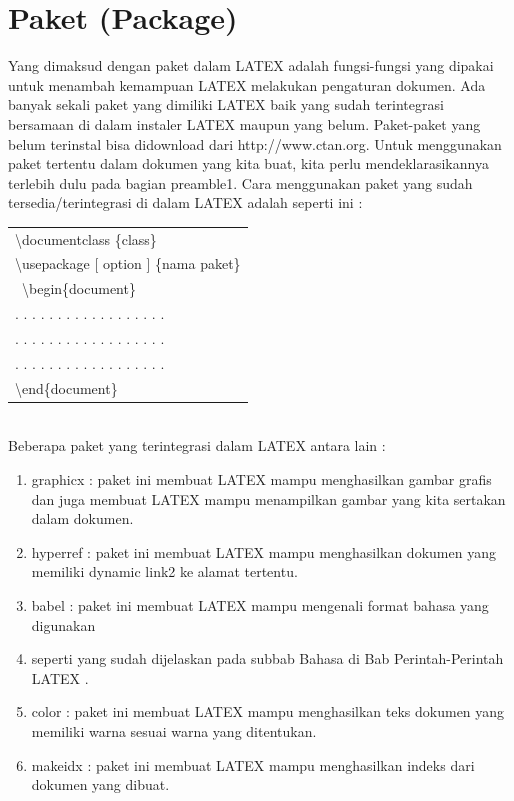 \section{Paket (Package)}
Yang dimaksud dengan paket dalam LATEX adalah fungsi-fungsi yang dipakai untuk menambah kemampuan LATEX melakukan pengaturan dokumen. Ada banyak sekali paket yang dimiliki LATEX baik yang sudah terintegrasi bersamaan di dalam instaler LATEX maupun yang belum. Paket-paket yang belum terinstal bisa didownload dari http://www.ctan.org. Untuk menggunakan paket tertentu dalam dokumen yang kita buat, kita perlu mendeklarasikannya terlebih dulu pada bagian preamble1. Cara menggunakan paket yang sudah tersedia/terintegrasi di dalam LATEX adalah seperti ini :\\[0.5 cm]
\begin{tabular}{|p{13.5 cm}|}
\hline
\textbackslash documentclass \{class\}\\
\textbackslash usepackage [ option ] \{nama paket\}\\\
\textbackslash begin\{document\}\\
. . . . . . . . . . . . . . . . . .\\
. . . . . . . . . . . . . . . . . .\\
. . . . . . . . . . . . . . . . . .\\
\textbackslash end\{document\}\\
\hline

\end{tabular}\\[0.5 cm]
Beberapa paket yang terintegrasi dalam LATEX antara lain :
\begin{enumerate}
\item	graphicx : paket ini membuat LATEX mampu menghasilkan gambar grafis dan juga membuat LATEX mampu menampilkan gambar yang kita sertakan dalam dokumen.
\item	hyperref : paket ini membuat LATEX mampu menghasilkan dokumen yang memiliki dynamic link2 ke alamat tertentu.
\item babel : paket ini membuat LATEX mampu mengenali format bahasa yang digunakan
\item	seperti yang sudah dijelaskan pada subbab Bahasa di Bab Perintah-Perintah LATEX .
\item	color : paket ini membuat LATEX mampu menghasilkan teks dokumen yang memiliki warna sesuai warna yang ditentukan.
\item	makeidx : paket ini membuat LATEX mampu menghasilkan indeks dari dokumen yang dibuat.
\end{enumerate}
